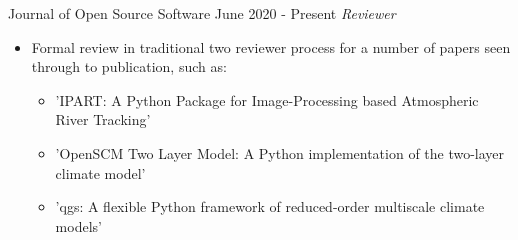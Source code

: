 \begin{projects}
\projecta
	{Journal of Open Source Software \lbrack\href{https://joss.theoj.org/}{\small{\websiteSymbol}}\rbrack}{June 2020 - Present}
	{
	    \textit{Reviewer}
	}
	{\begin{itemize}
     \item Formal review in traditional two reviewer process for a number of papers seen through to publication, such as:
     \begin{itemize}
        \item 'IPART: A Python Package for Image-Processing based Atmospheric River Tracking' \lbrack\href{https://joss.theoj.org/papers/10.21105/joss.02407}{\small{\websiteSymbol}}\rbrack
        \item 'OpenSCM Two Layer Model: A Python implementation of the two-layer climate model'
        \lbrack\href{https://joss.theoj.org/papers/10.21105/joss.02766}{\small{\websiteSymbol}}\rbrack
        \item 'qgs: A flexible Python framework of reduced-order multiscale climate models'
        \lbrack\href{https://joss.theoj.org/papers/10.21105/joss.02597}{\small{\websiteSymbol}}\rbrack
    \end{itemize}
     \end{itemize}}


\end{projects}
\vspace{-3mm}